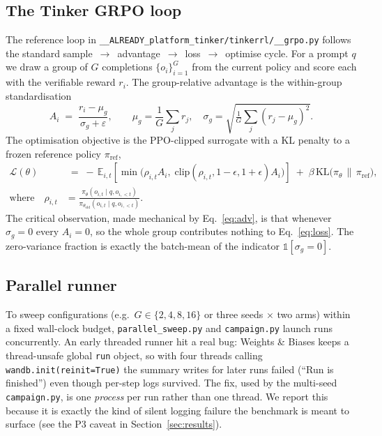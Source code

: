 \documentclass[12pt,a4paper]{report}
\begin{document}
\subsection{The Tinker GRPO loop}


The reference loop in \texttt{__ALREADY_platform_tinker/tinkerrl/__grpo.py} follows the standard
sample~$\rightarrow$~advantage~$\rightarrow$~loss~$\rightarrow$~optimise cycle.
For a prompt $q$ we draw a group of $G$ completions $\{o_i\}_{i=1}^{G}$ from the
current policy and score each with the verifiable reward $r_i$. The
group-relative advantage is the within-group standardisation
\begin{equation}
A_i \;=\; \frac{r_i - \mu_g}{\sigma_g + \varepsilon},
\qquad
\mu_g = \frac{1}{G}\sum_{j} r_j,\quad
\sigma_g = \sqrt{\tfrac{1}{G}\sum_j (r_j-\mu_g)^2}.
\label{eq:adv}
\end{equation}
The optimisation objective is the PPO-clipped surrogate with a KL penalty to a
frozen reference policy $\pi_{\mathrm{ref}}$,
\begin{align}
\mathcal{L}(\theta) &\;=\;
-\,\mathbb{E}_{i,t}\!\left[
\min\!\big(\rho_{i,t}A_i,\;
\mathrm{clip}(\rho_{i,t},1-\epsilon,1+\epsilon)A_i\big)
\right]
\;+\; \beta\, \mathrm{KL}\!\big(\pi_\theta \,\|\, \pi_{\mathrm{ref}}\big),
\label{eq:loss}\\[0.2em]
\text{where}\quad
\rho_{i,t} &=\frac{\pi_\theta(o_{i,t}\mid q,o_{i,<t})}{\pi_{\theta_{\mathrm{old}}}(o_{i,t}\mid q,o_{i,<t})}.
\nonumber
\end{align}
The critical observation, made mechanical by Eq.~\eqref{eq:adv}, is that whenever
$\sigma_g = 0$ every $A_i = 0$, so the whole group contributes nothing to
Eq.~\eqref{eq:loss}. The zero-variance fraction is exactly the batch-mean of the
indicator $\mathbb{1}[\sigma_g = 0]$.

\subsection{Parallel runner}
To sweep configurations (e.g.\ $G \in \{2,4,8,16\}$ or three seeds
$\times$ two arms) within a fixed wall-clock budget, \texttt{parallel\_sweep.py}
and \texttt{campaign.py} launch runs concurrently. An early threaded runner hit
a real bug: Weights \& Biases keeps a thread-unsafe global \texttt{run} object,
so with four threads calling \texttt{wandb.init(reinit=True)} the summary writes
for later runs failed (``Run is finished'') even though per-step logs survived.
The fix, used by the multi-seed \texttt{campaign.py}, is one \emph{process} per
run rather than one thread. We report this because it is exactly the kind of
silent logging failure the benchmark is meant to surface (see the P3 caveat in
Section~\ref{sec:results}).
\end{document}
